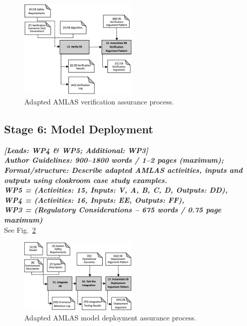 \documentclass[lettersize,journal]{IEEEtran}
\begin{document}

\begin{figure}
	\centering
	\includegraphics[width=0.5\textwidth]{figures/amlas-a-stage5_v2.png}%
	\caption{Adapted AMLAS verification assurance process.}
	\label{amlas-a-stage5}
\end{figure}


\subsection{Stage 6: Model Deployment} \label{framework-stage6}
\noindent \textbf{\textit{[Leads:  WP4 \& WP5; Additional: WP3]}}\\ 
\noindent\textbf{\textit{Author Guidelines: 900–1800 words / 1–2 pages (maximum); \\Format/structure: Describe adapted AMLAS activities, inputs and outputs using cloakroom case study examples.\\ 
\noindent WP5 = (Activities: 15, Inputs: V, A, B, C, D, Outputs: DD), \\
\noindent WP4 = (Activities: 16, Inputs: EE, Outputs: FF), \\
\noindent WP3 = (Regulatory Considerations – 675 words / 0.75 page maximum)}}\\
See Fig.~\ref{amlas-a-stage6}
\begin{figure}
	\centering
	\includegraphics[width=0.5\textwidth]{figures/amlas-a-stage6_v2.png}%
	\caption{Adapted AMLAS model deployment assurance process.}
	\label{amlas-a-stage6}
\end{figure}
\end{document}
